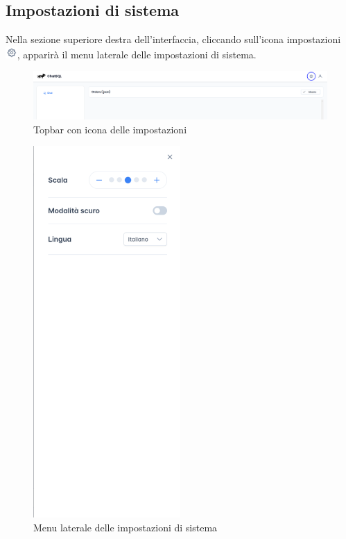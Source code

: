 \subsection{Impostazioni di sistema}
Nella sezione superiore destra dell'interfaccia, cliccando sull'icona impostazioni \includegraphics[height=1.2em]{assets/settings_icon.png}, apparirà il menu laterale delle impostazioni di sistema.
\begin{figure}[H]
  \centering
  \includegraphics[width=1\textwidth]{assets/settings_topbar.png}
  \caption{Topbar con icona delle impostazioni}
\end{figure}
\begin{figure}[H]
  \centering
  \includegraphics[width=0.50\textwidth]{assets/menu_config.png}
  \caption{Menu laterale delle impostazioni di sistema}
\end{figure}
